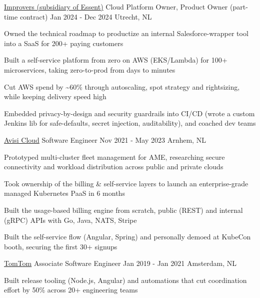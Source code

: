 \begin{cventries}
  \cventry
    {\href{https://improvers.nl}{Improvers (subsidiary of Essent)}}
    {Cloud Platform Owner, Product Owner (part-time contract)}
    {Jan 2024 - Dec 2024}
    {Utrecht, NL}
    {
      \begin{cvitems}
        \item {Owned the technical roadmap to productize an internal Salesforce-wrapper tool into a SaaS for 200+ paying customers}
        \item {Built a self-service platform from zero on AWS (EKS/Lambda) for 100+ microservices, taking zero-to-prod from days to minutes}
        \item {Cut AWS spend by \textasciitilde{}60\% through autoscaling, spot strategy and rightsizing, while keeping delivery speed high}
        \item {Embedded privacy-by-design and security guardrails into CI/CD (wrote a custom Jenkins lib for safe-defaults, secret injection, auditability), and coached dev teams}
      \end{cvitems}
    }

  \cventry
    {\href{https://avisi.cloud}{Avisi Cloud}}
    {Software Engineer}
    {Nov 2021 - May 2023}
    {Arnhem, NL}
    {
      \begin{cvitems}
        \item {Prototyped multi-cluster fleet management for AME, researching secure connectivity and workload distribution across public and private clouds}
        \item {Took ownership of the billing \& self-service layers to launch an enterprise-grade managed Kubernetes PaaS in 6 months}
        \item {Built the usage-based billing engine from scratch, public (REST) and internal (gRPC) APIs with Go, Java, NATS, Stripe}
        \item {Built the self-service flow (Angular, Spring) and personally demoed at KubeCon booth, securing the first 30+ signups}
      \end{cvitems}
    }

  \cventry
    {\href{https://tomtom.com}{TomTom}}
    {Associate Software Engineer}
    {Jan 2019 - Jan 2021}
    {Amsterdam, NL}
    {
      \begin{cvitems}
        \item {Built release tooling (Node.js, Angular) and automations that cut coordination effort by 50\% across 20+ engineering teams}
      \end{cvitems}
    }
\end{cventries}
